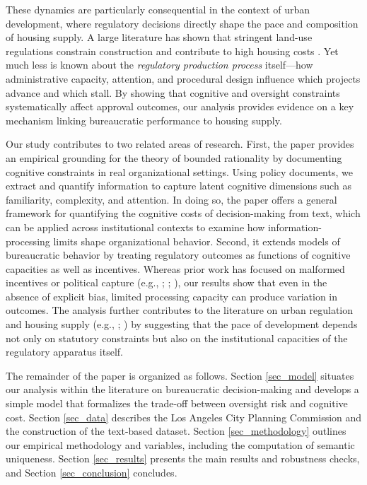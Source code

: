 These dynamics are particularly consequential in the context of urban development, where regulatory decisions directly shape the pace and composition of housing supply. A large literature has shown that stringent land-use regulations constrain construction and contribute to high housing costs \citep{hilber2016,ganongshoag2017,brueckner2020,glaeser2009,gabrielkung2025}. Yet much less is known about the \emph{regulatory production process} itself---how administrative capacity, attention, and procedural design influence which projects advance and which stall. By showing that cognitive and oversight constraints systematically affect approval outcomes, our analysis provides evidence on a key mechanism linking bureaucratic performance to housing supply.

Our study contributes to two related areas of research. First, the paper provides an empirical grounding for the theory of bounded rationality by documenting cognitive constraints in real organizational settings. Using policy documents, we extract and quantify information to capture latent cognitive dimensions such as familiarity, complexity, and attention. In doing so, the paper offers a general framework for quantifying the cognitive costs of decision-making from text, which can be applied across institutional contexts to examine how information-processing limits shape organizational behavior. Second, it extends models of bureaucratic behavior by treating regulatory outcomes as functions of cognitive capacities as well as incentives. Whereas prior work has focused on malformed incentives or political capture (e.g., \citealp{Prendergast2003}; \citealp{CarpenterKrause2012}; \citealp{BusuiocLodge2016}), our results show that even in the absence of explicit bias, limited processing capacity can produce variation in outcomes. The analysis further contributes to the literature on urban regulation and housing supply (e.g., \citealp{gyourkomolloy2015}; \citealp{molloy2020}) by suggesting that the pace of development depends not only on statutory constraints but also on the institutional capacities of the regulatory apparatus itself.

The remainder of the paper is organized as follows. Section \ref{sec_model} situates our analysis within the literature on bureaucratic decision-making and develops a simple model that formalizes the trade-off between oversight risk and cognitive cost. Section \ref{sec_data} describes the Los Angeles City Planning Commission and the construction of the text-based dataset. Section \ref{sec_methodology} outlines our empirical methodology and variables, including the computation of semantic uniqueness. Section \ref{sec_results} presents the main results and robustness checks, and Section \ref{sec_conclusion} concludes.